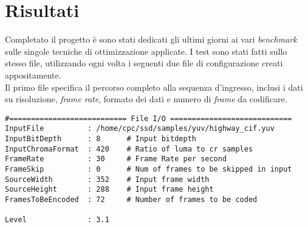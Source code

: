 
\chapter{Risultati} %

\label{Chapter7} %


Completato il progetto è sono stati dedicati gli ultimi giorni ai vari 
\emph{benchmark} sulle singole tecniche di ottimizzazione applicate. 
I test sono stati fatti sullo stesso file, utilizzando ogni volta i seguenti 
due file di configurazione creati appositamente.\\

Il primo file specifica il percorso completo alla sequenza d'ingresso, inclusi 
i dati su risoluzione, \emph{frame rate}, formato dei dati e numero di 
\emph{frame} da codificare.

\begin{lstlisting}
#=========================== File I/O ============================
InputFile          : /home/cpc/ssd/samples/yuv/highway_cif.yuv
InputBitDepth      : 8      # Input bitdepth
InputChromaFormat  : 420    # Ratio of luma to cr samples
FrameRate          : 30     # Frame Rate per second
FrameSkip          : 0      # Num of frames to be skipped in input
SourceWidth        : 352    # Input frame width
SourceHeight       : 288    # Input frame height
FramesToBeEncoded  : 72     # Number of frames to be coded
 
Level              : 3.1
\end{lstlisting}

